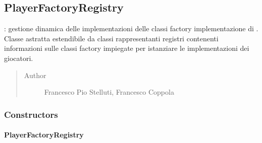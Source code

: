\documentclass[letterpaper,10pt,italian,openany,oneside]{sphinxmanual}
\begin{document}
\subsection{PlayerFactoryRegistry}
\label{\detokenize{source/it/unicam/cs/pa/mastermind/factories/PlayerFactoryRegistry:playerfactoryregistry}}\label{\detokenize{source/it/unicam/cs/pa/mastermind/factories/PlayerFactoryRegistry::doc}}

\begin{fulllineitems}
\label{\detokenize{source/it/unicam/cs/pa/mastermind/factories/PlayerFactoryRegistry:it.unicam.cs.pa.mastermind.factories.PlayerFactoryRegistry}}
: gestione dinamica delle implementazioni delle classi factory implementazione di . Classe astratta estendibile da classi rappresentanti registri contenenti informazioni sulle classi factory impiegate per istanziare le implementazioni dei giocatori.
\begin{quote}\begin{description}
\item[{Author}] \leavevmode
Francesco Pio Stelluti, Francesco Coppola

\end{description}\end{quote}

\end{fulllineitems}



\subsubsection{Constructors}
\label{\detokenize{source/it/unicam/cs/pa/mastermind/factories/PlayerFactoryRegistry:constructors}}

\paragraph{PlayerFactoryRegistry}
\label{\detokenize{source/it/unicam/cs/pa/mastermind/factories/PlayerFactoryRegistry:id1}}
\end{document}
